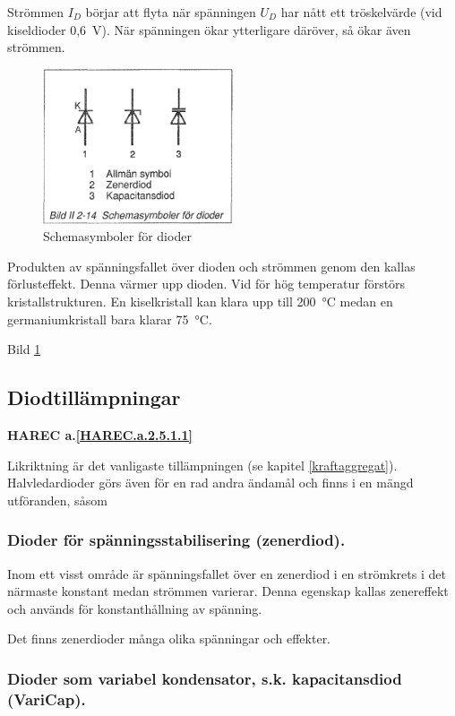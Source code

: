 Strömmen \(I_D\) börjar att flyta när spänningen \(U_D\) har nått ett
tröskelvärde (vid kiseldioder 0,6~V). När spänningen ökar ytterligare däröver,
så ökar även strömmen.

\begin{figure}
\includegraphics[width=0.5\textwidth]{images/bild_2_2-14}
\caption{Schemasymboler för dioder}
\label{fig:BildII2-14}
\end{figure}

Produkten av spänningsfallet över dioden och strömmen genom den kallas
förlusteffekt. Denna värmer upp dioden. Vid för hög temperatur förstörs
kristallstrukturen. En kiselkristall kan klara upp till 200~°C medan en
germaniumkristall bara klarar 75~°C.

Bild \ref{fig:BildII2-14}

\subsection{Diodtillämpningar}
\textbf{HAREC a.\ref{HAREC.a.2.5.1.1}\label{myHAREC.a.2.5.1.1}}

Likriktning är det vanligaste tillämpningen (se kapitel \ref{kraftaggregat}).
Halvledardioder görs även för en rad andra ändamål och finns i en mängd
utföranden, såsom

\subsubsection{Dioder för spänningsstabilisering (zenerdiod).}

  Inom ett visst område är spänningsfallet över en zenerdiod i en strömkrets
  i det närmaste konstant medan strömmen varierar. Denna egenskap kallas
  zenereffekt och används för konstanthållning av spänning.

  Det finns zenerdioder många olika spänningar och effekter.

\subsubsection{Dioder som variabel kondensator, s.k. kapacitansdiod (VariCap).}
\label{varicap}

